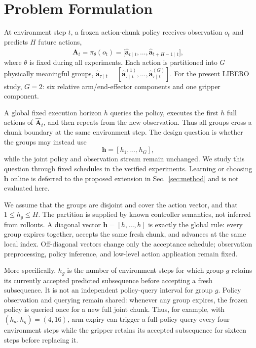 \section{Problem Formulation}
\label{sec:problem}

At environment step $t$, a frozen action-chunk policy receives observation
$o_t$ and predicts $H$ future actions,
\begin{equation}
\hat{\mathbf A}_t=\pi_\theta(o_t)
=\bigl[\hat{\mathbf a}_{t\mid t},\ldots,
\hat{\mathbf a}_{t+H-1\mid t}\bigr],
\label{eq:chunk}
\end{equation}
where $\theta$ is fixed during all experiments.  Each action is partitioned into
$G$ physically meaningful groups,
$\hat{\mathbf a}_{\tau\mid t}=
[\hat{\mathbf a}^{(1)}_{\tau\mid t},\ldots,
\hat{\mathbf a}^{(G)}_{\tau\mid t}]$.
For the present LIBERO study, $G=2$: six relative arm/end-effector components
and one gripper component.

A global fixed execution horizon $h$ queries the policy, executes the first $h$
full actions of $\hat{\mathbf A}_t$, and then repeats from the new observation.
Thus all groups cross a chunk boundary at the same environment step.  The design
question is whether the groups may instead use
\begin{equation}
\mathbf h=[h_1,\ldots,h_G],
\label{eq:group_horizons}
\end{equation}
while the joint policy and observation stream remain unchanged.  We study this
question through fixed schedules in the verified experiments.  Learning or
choosing $\mathbf h$ online is deferred to the proposed extension in
Sec.~\ref{sec:method} and is not evaluated here.

We assume that the groups are disjoint and cover the action vector, and that
$1\leq h_g\leq H$.  The partition is supplied by known controller semantics,
not inferred from rollouts.  A diagonal vector
$\mathbf h=[h,\ldots,h]$ is exactly the global rule: every group expires
together, accepts the same fresh chunk, and advances at the same local index.
Off-diagonal vectors change only the acceptance schedule; observation
preprocessing, policy inference, and low-level action application remain fixed.

More specifically, $h_g$ is the number of environment steps for which group
$g$ retains its currently accepted predicted subsequence before accepting a fresh
subsequence.  It is not an independent policy-query interval for group $g$.
Policy observation and querying remain shared: whenever any group expires, the
frozen policy is queried once for a new full joint chunk.  Thus, for example,
with $(h_a,h_g)=(4,16)$, arm expiry can trigger a full-policy query every four
environment steps while the gripper retains its accepted subsequence for sixteen
steps before replacing it.

